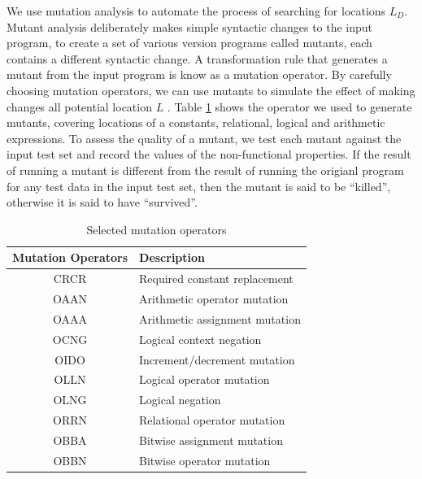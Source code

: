We use mutation analysis to automate the process of searching for locations $L_D$. Mutant analysis deliberately makes simple syntactic changes to the input program, to create a set of various version programs called mutants, each contains a different syntactic change. A transformation rule that generates a mutant from the input program is know as a mutation operator. By carefully choosing mutation operators, we can use mutants to simulate the effect of making changes all potential location $L$ . Table \ref{tab:cmop} shows the operator we used to generate mutants, covering locations of a constants, relational, logical and arithmetic expressions. 
To assess the quality of a mutant, we test each mutant against the input test set and record the values of the non-functional properties. If the result of running a mutant is different from the result of running the origianl program for any test data in the input test set, then the mutant is said to be ``killed'', otherwise it is said to have ``survived''. 

\begin{table} [htbp]
\caption{Selected mutation operators}
\label{tab:cmop} 
\begin{center}
\begin{tabular}{ | c | l |}
  \hline
  Mutation Operators & Description \\ 
\hline
  CRCR & Required constant replacement \\
  OAAN & Arithmetic operator mutation \\
  OAAA & Arithmetic assignment mutation \\
  OCNG & Logical context negation \\
  OIDO & Increment/decrement mutation  \\
  OLLN & Logical operator mutation  \\ 
  OLNG & Logical negation \\
  ORRN & Relational operator mutation \\
  OBBA & Bitwise assignment mutation \\
  OBBN & Bitwise operator mutation \\
\hline
\end{tabular} 
\end{center} 
\end{table} 

